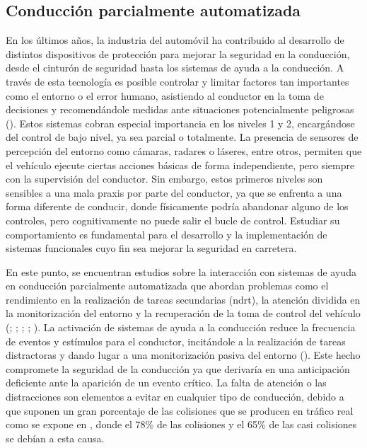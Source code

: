 \subsection{Conducción parcialmente automatizada}
En los últimos años, la industria del automóvil ha contribuido al desarrollo de distintos dispositivos de protección para mejorar la seguridad en la conducción, desde el cinturón de seguridad hasta los sistemas de ayuda a la conducción. A través de esta tecnología es posible controlar y limitar factores tan importantes como el entorno o el error humano, asistiendo al conductor en la toma de decisiones y recomendándole medidas ante situaciones potencialmente peligrosas (\cite{schoegg}). Estos sistemas cobran especial importancia en los niveles 1 y 2, encargándose del control de bajo nivel, ya sea parcial o totalmente. La presencia de sensores de percepción del entorno como cámaras, radares o láseres, entre otros, permiten que el vehículo ejecute ciertas acciones básicas de forma independiente, pero siempre con la supervisión del conductor. Sin embargo, estos primeros niveles son sensibles a una mala praxis por parte del conductor, ya que se enfrenta a una forma diferente de conducir, donde físicamente podría abandonar alguno de los controles, pero cognitivamente no puede salir el bucle de control. Estudiar su comportamiento es fundamental para el desarrollo y la implementación de sistemas funcionales cuyo fin sea mejorar la seguridad en carretera. 

En este punto, se encuentran estudios sobre la interacción con sistemas de ayuda en conducción parcialmente automatizada que abordan problemas como el rendimiento en la realización de tareas secundarias (\gls{ndrt}), la atención dividida en la monitorización del entorno y la recuperación de la toma de control del vehículo (\cite{naujoks16}; \cite{solismarcos}; \cite{hensch}; \cite{zangi}; \cite{li22a}). La activación de sistemas de ayuda a la conducción reduce la frecuencia de eventos y estímulos para el conductor, incitándole a la realización de tareas distractoras y dando lugar a una monitorización pasiva del entorno (\cite{endsley}). Este hecho compromete la seguridad de la conducción ya que derivaría en una anticipación deficiente ante la aparición de un evento crítico. La falta de atención o las distracciones son elementos a evitar en cualquier tipo de conducción, debido a que suponen un gran porcentaje de las colisiones que se producen en tráfico real como se expone en \textcite{neale}, donde el 78\% de las colisiones y el 65\% de las casi colisiones se debían a esta causa.

